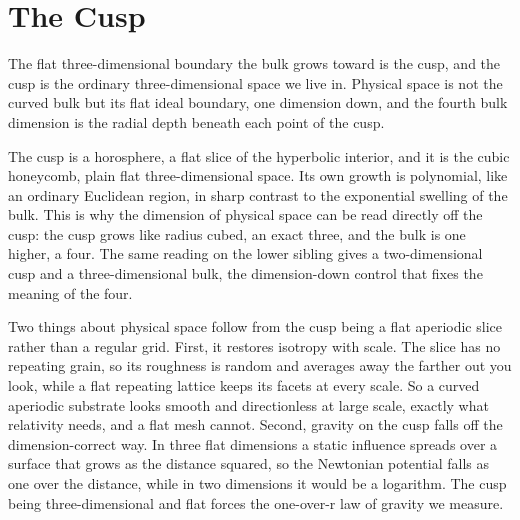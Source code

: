 \section{The Cusp}

The flat three-dimensional boundary the bulk grows toward is the cusp, and the cusp is the ordinary three-dimensional space we live in. Physical space is not the curved bulk but its flat ideal boundary, one dimension down, and the fourth bulk dimension is the radial depth beneath each point of the cusp.

The cusp is a horosphere, a flat slice of the hyperbolic interior, and it is the cubic honeycomb, plain flat three-dimensional space. Its own growth is polynomial, like an ordinary Euclidean region, in sharp contrast to the exponential swelling of the bulk. This is why the dimension of physical space can be read directly off the cusp: the cusp grows like radius cubed, an exact three, and the bulk is one higher, a four. The same reading on the lower sibling gives a two-dimensional cusp and a three-dimensional bulk, the dimension-down control that fixes the meaning of the four.

Two things about physical space follow from the cusp being a flat aperiodic slice rather than a regular grid. First, it restores isotropy with scale. The slice has no repeating grain, so its roughness is random and averages away the farther out you look, while a flat repeating lattice keeps its facets at every scale. So a curved aperiodic substrate looks smooth and directionless at large scale, exactly what relativity needs, and a flat mesh cannot. Second, gravity on the cusp falls off the dimension-correct way. In three flat dimensions a static influence spreads over a surface that grows as the distance squared, so the Newtonian potential falls as one over the distance, while in two dimensions it would be a logarithm. The cusp being three-dimensional and flat forces the one-over-r law of gravity we measure.
